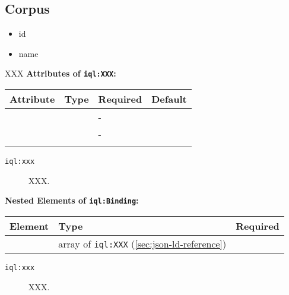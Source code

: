 \documentclass[11pt]{article}
\newcommand{\iqlns}{iql:}
\newcommand{\iqlType}[1]{\texttt{\iqlns#1}}
\newcommand{\attributes}[1]{\noindent\textbf{Attributes of \iqlType{#1}:}\newline\medskip}
\newcommand{\elements}[1]{\noindent\textbf{Nested Elements of \iqlType{#1}:}\newline\medskip}
\newcommand{\desc}[1]{\noindent#1\newline\medskip}
\begin{document}
\subsection{Corpus}
\label{sec:json-ld-corpus}
\begin{itemize}
\item id
\item name
\end{itemize}
\desc{XXX}
\attributes{XXX}
\begin{tabular}{|p{}|p{}|p{}|p{}|}
	\hline
	\textbf{Attribute} & \textbf{Type} & \textbf{Required} & \textbf{Default} \\ 
	\hline
	\hline
	&  & - &  \\ 
	\hline 
	&  & - &  \\ 
	\hline 
	&  &  & \\ 
	\hline 
\end{tabular}
\begin{description}
	\item[\iqlType{xxx}] XXX.
\end{description}
\elements{Binding}
\begin{tabular}{|p{}|p{}|p{}|}
	\hline
	\textbf{Element} & \textbf{Type} & \textbf{Required} \\ 
	\hline
	\hline 
	& array of \iqlType{XXX} (\ref{sec:json-ld-reference}) &  \\ 
	\hline 
\end{tabular}
\begin{description}
	\item[\iqlType{xxx}] XXX.
\end{description}

\end{document}

